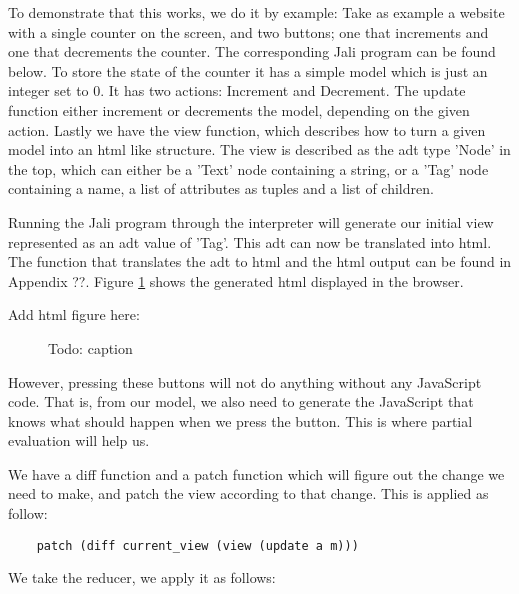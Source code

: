 To demonstrate that this works, we do it by example: Take as example a website with a single counter on the screen, and two buttons; one that increments and one that decrements the counter. The corresponding Jali program can be found below. To store the state of the counter it has a simple model which is just an integer set to 0. It has two actions: Increment and Decrement. The update function either increment or decrements the model, depending on the given action. Lastly we have the view function, which describes how to turn a given model into an \gls{html} like structure. The view is described as the \gls{adt} type 'Node' in the top, which can either be a 'Text' node containing a string, or a 'Tag' node containing a name, a list of attributes as tuples and a list of children.



Running the Jali program through the interpreter will generate our initial view represented as an \gls{adt} value of 'Tag'. This \gls{adt} can now be translated into \gls{html}. The function that translates the \gls{adt} to \gls{html} and the \gls{html} output can be found in Appendix ??. Figure \ref{fig:buttons_in_browser} shows the generated \gls{html} displayed in the browser.   



Add html figure here:
\begin{figure}
    \centering
    \caption{Todo: caption}
    \label{fig:buttons_in_browser}
\end{figure}


However, pressing these buttons will not do anything without any JavaScript code. That is, from our model, we also need to generate the JavaScript that knows what should happen when we press the button. This is where partial evaluation will help us. 

We have a diff function and a patch function which will figure out the change we need to make, and patch the view according to that change. This is applied as follow: 
\begin{verbatim}
    patch (diff current_view (view (update a m)))
\end{verbatim}

We take the reducer, we apply it as follows:

